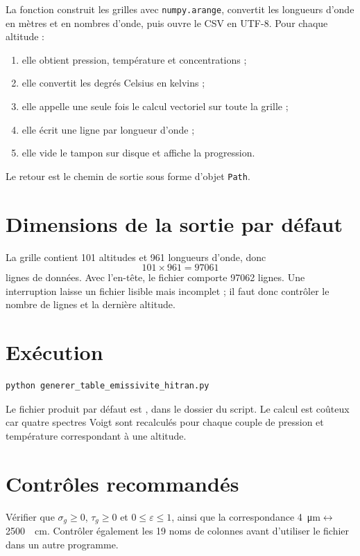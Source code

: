 \documentclass[11pt,a4paper]{article}
\begin{document}
La fonction construit les grilles avec \texttt{numpy.arange}, convertit les
longueurs d'onde en mètres et en nombres d'onde, puis ouvre le CSV en UTF-8.
Pour chaque altitude :

\begin{enumerate}
  \item elle obtient pression, température et concentrations ;
  \item elle convertit les degrés Celsius en kelvins ;
  \item elle appelle une seule fois le calcul vectoriel sur toute la grille ;
  \item elle écrit une ligne par longueur d'onde ;
  \item elle vide le tampon sur disque et affiche la progression.
\end{enumerate}

Le retour est le chemin de sortie sous forme d'objet \texttt{Path}.

\section{Dimensions de la sortie par défaut}

La grille contient 101 altitudes et 961 longueurs d'onde, donc
\begin{equation}
101\times961=97061
\end{equation}
lignes de données. Avec l'en-tête, le fichier comporte 97062 lignes. Une
interruption laisse un fichier lisible mais incomplet ; il faut donc contrôler
le nombre de lignes et la dernière altitude.

\section{Exécution}

\begin{lstlisting}[language=bash]
python generer_table_emissivite_hitran.py
\end{lstlisting}

Le fichier produit par défaut est
, dans le dossier du script.
Le calcul est coûteux car quatre spectres Voigt sont recalculés pour chaque
couple de pression et température correspondant à une altitude.

\section{Contrôles recommandés}

Vérifier que $\sigma_g\geq0$, $\tau_g\geq0$ et
$0\leq\varepsilon\leq1$, ainsi que la correspondance
\SI{4}{\micro\metre}$\leftrightarrow$\SI{2500}{\per\centi\metre}. Contrôler
également les 19 noms de colonnes avant d'utiliser le fichier dans un autre
programme.
\end{document}
